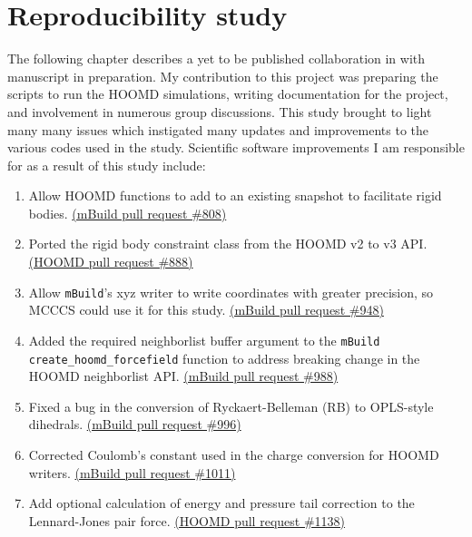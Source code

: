 \chapter{Reproducibility study}
\label{chap:reproducibility}

The following chapter describes a yet to be published collaboration in with manuscript in preparation.
My contribution to this project was preparing the scripts to run the HOOMD simulations, writing documentation for the project, and involvement in numerous group discussions. 
This study brought to light many many issues which instigated many updates and improvements to the various codes used in the study.
Scientific software improvements I am responsible for as a result of this study include:
\begin{enumerate}
    \item Allow HOOMD functions to add to an existing snapshot to facilitate rigid bodies. \href{https://github.com/mosdef-hub/mbuild/pull/808}{(mBuild pull request \#808)}
    \item Ported the rigid body constraint class from the HOOMD v2 to v3 API. \href{https://github.com/glotzerlab/hoomd-blue/pull/888}{(HOOMD pull request \#888)}
    \item Allow \texttt{mBuild}'s xyz writer to write coordinates with greater precision, so MCCCS could use it for this study. \href{https://github.com/mosdef-hub/mbuild/pull/996}{(mBuild pull request \#948)}
    \item Added the required neighborlist buffer argument to the \texttt{mBuild} \lstinline{create_hoomd_forcefield} function to address breaking change in the HOOMD neighborlist API. \href{https://github.com/mosdef-hub/mbuild/pull/988}{(mBuild pull request \#988)}
    \item Fixed a bug in the conversion of Ryckaert-Belleman (RB) to OPLS-style dihedrals. \href{https://github.com/mosdef-hub/mbuild/pull/996}{(mBuild pull request \#996)}
    \item Corrected Coulomb's constant used in the charge conversion for HOOMD writers. \href{https://github.com/mosdef-hub/mbuild/pull/1011}{(mBuild pull request \#1011)}
    \item Add optional calculation of energy and pressure tail correction to the Lennard-Jones pair force. \href{https://github.com/glotzerlab/hoomd-blue/pull/1138}{(HOOMD pull request \#1138)}
\end{enumerate}


